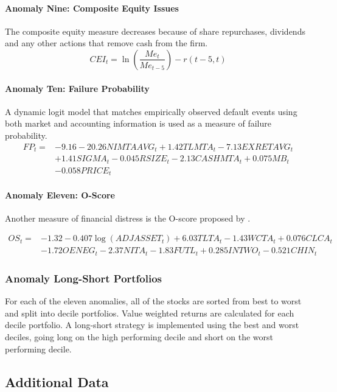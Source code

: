 \documentclass[12pt, a4paper, oneside]{article}
\begin{document}
\paragraph*{Anomaly Nine: Composite Equity Issues}
The composite equity measure decreases because of share repurchases, dividends and any other actions that remove cash from the firm. 
\[
CEI_t = \ln (\frac{Me_t}{Me_{t-5}})  - r(t - 5,t)
\]

\paragraph*{Anomaly Ten: Failure Probability }
A dynamic logit model that matches empirically observed default events using both market and accounting information is used as a measure of failure probability. 
\begin{align*}
    FP_t =  &- 9.16 - 20.26 NIMTAAVG_t+ 1.42 TLMTA_t  - 7.13 EXRETAVG_t \\
    &+ 1.41 SIGMA_t  - 0.045 RSIZE_t - 2.13 CASHMTA_t + 0.075 MB_t \\
    &- 0.058 PRICE_t
\end{align*}

\paragraph*{Anomaly Eleven: O-Score}
Another measure of financial distress is the O-score proposed by .

\begin{align*}
    OS_t = &- 1.32 - 0.407 \log (ADJASSET_t )  + 6.03 TLTA_t- 1.43 WCTA_t+ 0.076 CLCA_t \\
    &- 1.72O ENEG_t- 2.37 NITA_t- 1.83 FUTL_t+ 0.285 INTWO_t- 0.521 CHIN_t
\end{align*}

\subsubsection{Anomaly Long-Short Portfolios}
For each of the eleven anomalies, all of the stocks are sorted from best to worst and split into decile portfolios. Value weighted returns are calculated for each decile portfolio. A long-short strategy is implemented using the best and worst deciles, going long on the high performing decile and short on the worst performing decile. 

\subsection{Additional Data}
\end{document}
